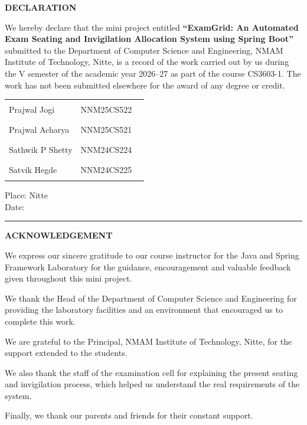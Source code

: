\documentclass[12pt,a4paper,oneside]{report}
\begin{document}
\thispagestyle{plain}
\begin{center}{\Large\bfseries\color{egnavy} DECLARATION}\end{center}
\vspace{0.5cm}
We hereby declare that the mini project entitled \textbf{``ExamGrid: An Automated Exam Seating and Invigilation Allocation System using Spring Boot''} submitted to the Department of Computer Science and Engineering, NMAM Institute of Technology, Nitte, is a record of the work carried out by us during the V semester of the academic year 2026--27 as part of the course CS3603-1. The work has not been submitted elsewhere for the award of any degree or credit.
\vspace{2cm}

\noindent\begin{tabular}{@{}p{5.5cm}p{3.5cm}p{4cm}@{}}
Prajwal Jogi & NNM25CS522 & \rule{3.5cm}{0.4pt}\\[0.7cm]
Prajwal Acharya & NNM25CS521 & \rule{3.5cm}{0.4pt}\\[0.7cm]
Sathwik P Shetty & NNM24CS224 & \rule{3.5cm}{0.4pt}\\[0.7cm]
Satvik Hegde & NNM24CS225 & \rule{3.5cm}{0.4pt}\\
\end{tabular}

\vspace{1cm}\noindent Place: Nitte\\Date: \rule{3cm}{0.4pt}
\newpage

\thispagestyle{plain}
\begin{center}{\Large\bfseries\color{egnavy} ACKNOWLEDGEMENT}\end{center}
\vspace{0.5cm}
We express our sincere gratitude to our course instructor for the Java and Spring Framework Laboratory for the guidance, encouragement and valuable feedback given throughout this mini project.

We thank the Head of the Department of Computer Science and Engineering for providing the laboratory facilities and an environment that encouraged us to complete this work.

We are grateful to the Principal, NMAM Institute of Technology, Nitte, for the support extended to the students.

We also thank the staff of the examination cell for explaining the present seating and invigilation process, which helped us understand the real requirements of the system.

Finally, we thank our parents and friends for their constant support.
\vspace{1cm}
\end{document}
